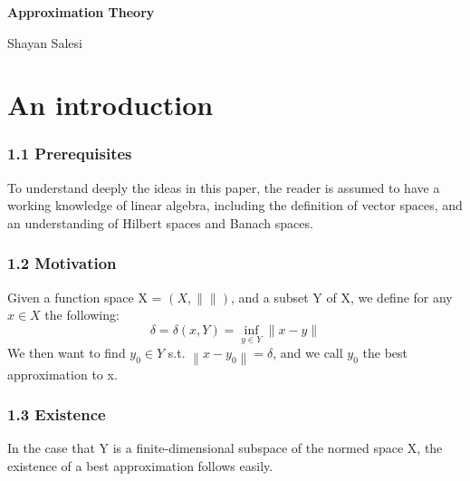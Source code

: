 \documentclass[12pt]{extarticle}
\newcommand{\norm}[1]{\left\lVert #1 \right\rVert}
\begin{document}
	\begin{center}
		\textbf{\Large Approximation Theory}
	\end{center}
	\begin{center}
		Shayan Salesi
	\end{center}

\part{An introduction}
	
\section*{1.1 Prerequisites}
To understand deeply the ideas in this paper, the reader is assumed to have a working knowledge of linear algebra, including the definition of vector spaces, and an understanding of Hilbert spaces and Banach spaces.

\section*{1.2 Motivation}
Given a function space X = $(X, \parallel \parallel)$, and a subset Y of X, we define for any $x\in X$ the following:
\begin{equation}
	\delta = \delta(x, Y) = \inf_{y\in Y}\parallel x-y \parallel
\end{equation}
We then want to find $y_0 \in Y$ s.t. $\norm{x-y_0} = \delta$, and we call $y_0$ the best approximation to x.
	
\section*{1.3 Existence}
In the case that Y is a finite-dimensional subspace of the normed space X, the existence of a best approximation follows easily.
\end{document}
